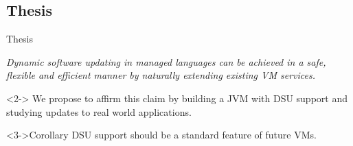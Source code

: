 \subsection{Thesis}
\begin{frame}{Thesis}%
\begin{block}{}
\emph{Dynamic software updating in managed languages can be achieved in a
safe, flexible and efficient manner by naturally extending existing VM
services.}
\end{block}

\begin{block}<2->{}
We propose to affirm this claim by building a JVM with DSU support and
studying updates to real world applications.
\end{block}

\begin{block}<3->{Corollary}
DSU support should be a standard feature of future VMs.
\end{block}
\end{frame}
